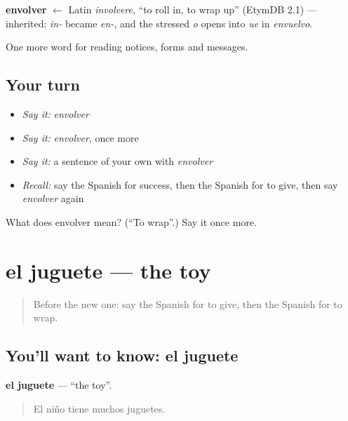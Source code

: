 \begin{cousinweb}
\textbf{envolver} $\leftarrow$ Latin \emph{involvere}, \textquotedblleft{}to roll in, to wrap up\textquotedblright{} (EtymDB 2.1) — inherited: \emph{in-} became \emph{en-}, and the stressed \emph{o} opens into \emph{ue} in \emph{envuelvo}.
\end{cousinweb}

\begin{grammarlens}[title={What you've built}]
One more word for reading notices, forms and messages.
\end{grammarlens}

\subsection*{Your turn}
\begin{itemize}
\raggedright
  \item \emph{Say it:} \emph{envolver}
  \item \emph{Say it:} \emph{envolver}, once more
  \item \emph{Say it:} a sentence of your own with \emph{envolver}
  \item \emph{Recall:} say the Spanish for success, then the Spanish for to give, then say \emph{envolver} again
\end{itemize}

\begin{tcolorbox}[breakable,colback=teal!4,colframe=teal!35!black,title={Before you move on}]
What does envolver mean? (\textquotedblleft{}To wrap\textquotedblright{}.) Say it once more.
\end{tcolorbox}
\section[el juguete]{el juguete — the toy}

\label{lesson:ES-C506-juguete}



\begin{quote}
Before the new one: say the Spanish for to give, then the Spanish for to wrap.
\end{quote}

\subsection*{You'll want to know: el juguete}
\textbf{el juguete} — \textquotedblleft{}the toy\textquotedblright{}.

\begin{quote}
El niño tiene muchos juguetes.
\end{quote}

